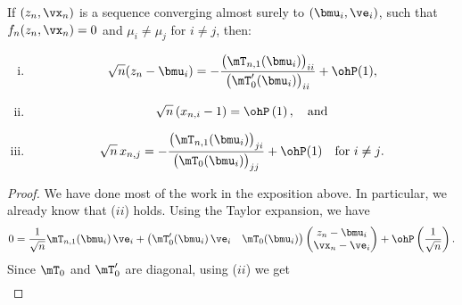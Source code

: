 \begin{lemma}
    If $(z_n, \vx_n)$ is a sequence converging almost surely to 
    $(\bmu_i, \ve_i)$, such that $f_n(z_n, \vx_n) = 0$ and $\mu_i \neq \mu_j$
    for $i \neq j$, then:
    \begin{enumerate}[(i)]
        \item \begin{equation}
                  \sqrt{n} ( z_n - \bmu_i) 
                  = 
                  -
                  \frac{\big(\mT_{n,1}(\bmu_i) \big)_{ii}}
                       {\big(\mT_0'(\bmu_i) \big)_{ii}}
                  +
                  \ohP(1),
              \end{equation}
        \item \begin{equation}
                   \sqrt{n} \left( x_{n,i} - 1 \right)
                   =
                   \ohP\left( 1 \right), \quad \text{and}
              \end{equation}
        \item \begin{equation}
                  \sqrt{n} \, x_{n,j}
                  = 
                  -
                  \frac{\big(\mT_{n,1}(\bmu_i) \big)_{ji}}
                       {\big(\mT_0(\bmu_i) \big)_{jj}}
                  +
                  \ohP(1)
                  \quad
                  \text{for $i \neq j$.}
              \end{equation}
    \end{enumerate}
    \begin{proof}
        We have done most of the work in the exposition above.  In particular,
        we already know that ($ii$) holds.  Using the Taylor expansion, we 
        have
        \[
            0
            =
            \frac{1}{\sqrt{n}}
            \mT_{n,1}(\bmu_i) \, \ve_i
            +
            \left(
            \begin{matrix}
                \mT_0'(\bmu_i) \, \ve_i & \mT_0(\bmu_i)
            \end{matrix}
            \right)
            \left(
            \begin{matrix}
                z_n - \bmu_i \\
                \vx_n - \ve_i
            \end{matrix}
            \right)
            +
            \ohP\left( \frac{1}{\sqrt{n}} \right).
        \]
        Since $\mT_0$ and $\mT_0'$ are diagonal, using ($ii$) we get
        \begin{align*}

\end{align*}
\end{proof}
\end{lemma}
